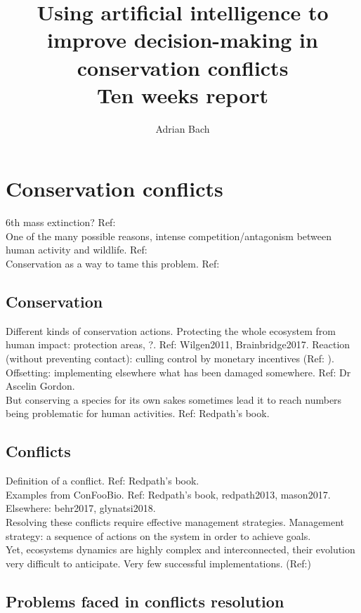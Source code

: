 \documentclass[12pt,a4paper]{article}
\author{Adrian Bach}
\title{Using artificial intelligence to improve decision-making in conservation conflicts \\\medskip Ten weeks report}
\begin{document}
\maketitle

\tableofcontents

\newpage
\section{Conservation conflicts}

6th mass extinction? Ref: \\
One of the many possible reasons, intense competition/antagonism between human activity and wildlife. Ref: \\
Conservation as a way to tame this problem. Ref: \\

\subsection{Conservation}

Different kinds of conservation actions.
Protecting the whole ecosystem from human impact: protection areas, ?. Ref: Wilgen2011, Brainbridge2017.
Reaction (without preventing contact): culling control by monetary incentives (Ref: ).
Offsetting: implementing elsewhere what has been damaged somewhere. Ref: Dr Ascelin Gordon.\\
But conserving a species for its own sakes sometimes lead it to reach numbers being problematic for human activities. Ref: Redpath's book.

\subsection{Conflicts}

Definition of a conflict. Ref: Redpath's book.\\
Examples from ConFooBio. Ref: Redpath's book, redpath2013, mason2017.
Elsewhere: behr2017, glynatsi2018.\\
Resolving these conflicts require effective management strategies.
Management strategy: a sequence of actions on the system in order to achieve goals.\\
Yet, ecosystems dynamics are highly complex and interconnected, their evolution very difficult to anticipate.
Very few successful implementations. (Ref:)

\subsection{Problems faced in conflicts resolution}
\end{document}
